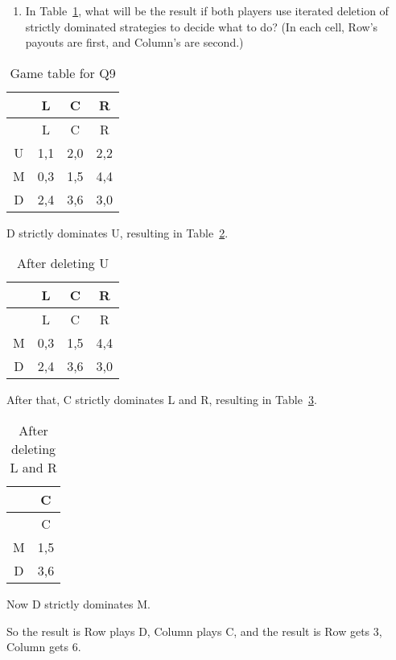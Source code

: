 \documentclass[
  12pt,
  letterpaper,
  DIV=11,
  numbers=noendperiod]{scrartcl}
\providecommand{\tightlist}{%
  \setlength{\itemsep}{0pt}\setlength{\parskip}{0pt}}\usepackage{longtable,booktabs,array}
\begin{document}
\begin{enumerate}
\def\labelenumi{\arabic{enumi}.}
\setcounter{enumi}{8}
\tightlist
\item
  In Table~\ref{tbl-dom}, what will be the result if both players use
  iterated deletion of strictly dominated strategies to decide what to
  do? (In each cell, Row's payouts are first, and Column's are second.)
\end{enumerate}

\begin{longtable}[]{@{}cccc@{}}
\caption{Game table for Q9}\label{tbl-dom}\tabularnewline
\toprule\noalign{}
& L & C & R \\
\midrule\noalign{}
\endfirsthead
\toprule\noalign{}
& L & C & R \\
\midrule\noalign{}
\endhead
\bottomrule\noalign{}
\endlastfoot
U & 1,1 & 2,0 & 2,2 \\
M & 0,3 & 1,5 & 4,4 \\
D & 2,4 & 3,6 & 3,0 \\
\end{longtable}

D strictly dominates U, resulting in Table~\ref{tbl-dom-r1}.

\begin{longtable}[]{@{}cccc@{}}
\caption{After deleting U}\label{tbl-dom-r1}\tabularnewline
\toprule\noalign{}
& L & C & R \\
\midrule\noalign{}
\endfirsthead
\toprule\noalign{}
& L & C & R \\
\midrule\noalign{}
\endhead
\bottomrule\noalign{}
\endlastfoot
M & 0,3 & 1,5 & 4,4 \\
D & 2,4 & 3,6 & 3,0 \\
\end{longtable}

After that, C strictly dominates L and R, resulting in
Table~\ref{tbl-dom-r2}.

\begin{longtable}[]{@{}cc@{}}
\caption{After deleting L and R}\label{tbl-dom-r2}\tabularnewline
\toprule\noalign{}
& C \\
\midrule\noalign{}
\endfirsthead
\toprule\noalign{}
& C \\
\midrule\noalign{}
\endhead
\bottomrule\noalign{}
\endlastfoot
M & 1,5 \\
D & 3,6 \\
\end{longtable}

Now D strictly dominates M.

So the result is Row plays D, Column plays C, and the result is Row gets
3, Column gets 6.
\end{document}
